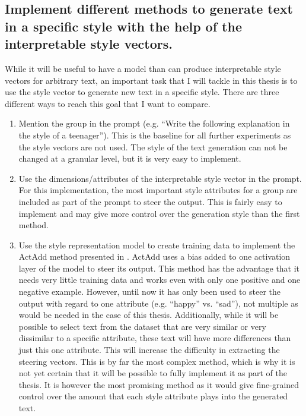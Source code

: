 \subsection{Implement different methods to generate text in a specific style with the help of the interpretable style vectors.}
While it will be useful to have a model than can produce interpretable style vectors for arbitrary text, an important task that I will tackle in this thesis is to use the style vector to generate new text in a specific style. There are three different ways to reach this goal that I want to compare.
\begin{enumerate}
	\item Mention the group in the prompt (e.g. \enquote{Write the following explanation in the style of a teenager}). This is the baseline for all further experiments as the style vectors are not used. The style of the text generation can not be changed at a granular level, but it is very easy to implement.
	\item Use the dimensions/attributes of the interpretable style vector in the prompt. For this implementation, the most important style attributes for a group are included as part of the prompt to steer the output. This is fairly easy to implement and may give more control over the generation style than the first method.
	\item Use the style representation model to create training data to implement the ActAdd method presented in \citet{turnerActivationAdditionSteering2024}. ActAdd uses a bias added to one activation layer of the model to steer its output. This method has the advantage that it needs very little training data and works even with only one positive and one negative example. However, until now it has only been used to steer the output with regard to one attribute (e.g. \enquote{happy} vs. \enquote{sad}), not multiple as would be needed in the case of this thesis. Additionally, while it will be possible to select text from the dataset that are very similar or very dissimilar to a specific attribute, these text will have more differences than just this one attribute. This will increase the difficulty in extracting the steering vectors.
	      This is by far the most complex method, which is why it is not yet certain that it will be possible to fully implement it as part of the thesis. It is however the most promising method as it would give fine-grained control over the amount that each style attribute plays into the generated text.
\end{enumerate}

